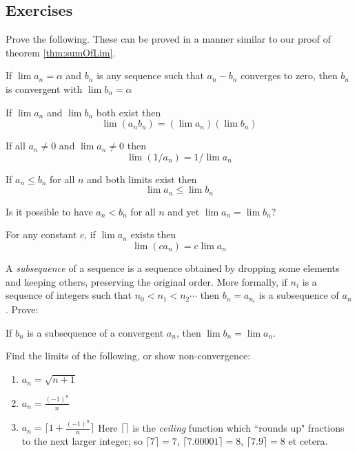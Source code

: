 \subsection{Exercises}\label{sec:limitTheorems}
Prove the following.  These can be proved in a manner similar to our proof of theorem \ref{thm:sumOfLim}.

\begin{thm}\label{thm:equalLim}
If $\lim a_n = \alpha$ and $b_n$ is any sequence such that $a_n-b_n$ converges to zero, then $b_n$ is convergent with $\lim b_n = \alpha$
\end{thm}

\begin{thm}\label{thm:prodOfLim}
If $\lim a_n$ and $\lim b_n$ both exist then 
\[
\lim (a_nb_n) = (\lim a_n) (\lim b_n)
\]  
\end{thm}

\begin{thm}\label{thm:invOfLim}
If all $a_n \neq 0$ and $\lim a_n \neq 0$ then
\[
\lim (1/a_n) = 1/\lim a_n
\]  
\end{thm}

\begin{thm}\label{thm:ineqLim}
If $a_n \leq b_n$ for all $n$ and both limits exist then
\[
\lim a_n \leq \lim b_n
\]  
\end{thm}
Is it possible to have $a_n < b_n$ for all $n$ and yet $\lim a_n = \lim b_n$?

\begin{thm}\label{thm:constTimesLim}
For any constant $c$, if $\lim a_n$ exists then
\[
\lim (ca_n) = c\lim a_n
\]  
\end{thm}

A \emph{subsequence} of a sequence is a sequence obtained by dropping some elements and keeping others, preserving the original order. More formally, if $n_i$ is a sequence of integers such that $n_0 < n_1 < n_2 \cdots$ then $b_n = a_{n_i}$ is a subsequence of $a_n$. Prove:
\begin{thm}\label{thm:subsequenceLim}
If $b_n$ is a subsequence of a convergent $a_n$, then $\lim b_n = \lim a_n$.
\end{thm}


Find the limits of the following, or show non-convergence:
\begin{enumerate}
\item $a_n = \sqrt{n+1}$
\item $a_n = \frac{(-1)^n}{n}$
\item $a_n = \lceil 1 + \frac{(-1)^n}{n} \rceil$ Here $\lceil\rceil$ is the \emph{ceiling} function which ``rounds up" fractions to the next larger integer; so  $\lceil7\rceil=7$,  $\lceil7.00001\rceil=8$, $\lceil7.9\rceil=8$ et cetera.
\end{enumerate}



